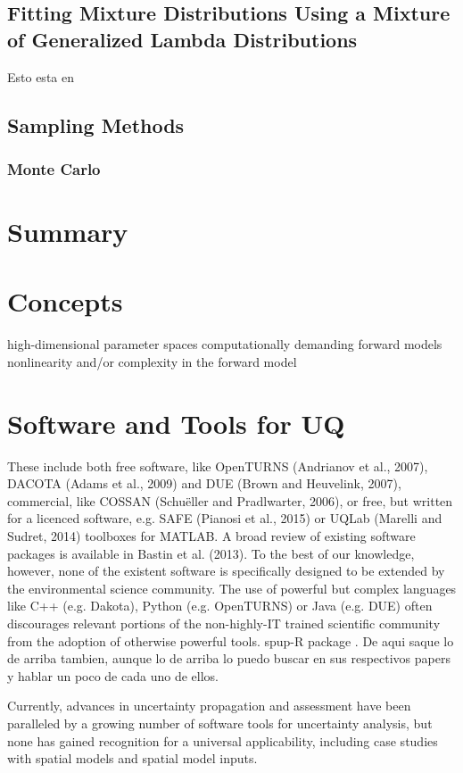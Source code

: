 \subsection{Fitting Mixture Distributions Using a Mixture of Generalized Lambda Distributions}
Esto esta en \cite{Tobergte2013}

\subsection{Sampling Methods}

\subsubsection{Monte Carlo}

\section{Summary}

\section{Concepts}
high-dimensional parameter spaces %
computationally demanding forward models 
nonlinearity and/or complexity in the forward model

\section{Software and Tools for UQ}
These include both free software, like OpenTURNS (Andrianov et al., 2007), DACOTA (Adams et al., 2009) and DUE (Brown and Heuvelink, 2007), commercial, like COSSAN (Schuëller and Pradlwarter, 2006), or free, but written for a licenced software, e.g. SAFE (Pianosi et al., 2015) or UQLab (Marelli and Sudret, 2014) toolboxes for MATLAB. A broad review of existing software packages is available in Bastin et al. (2013). To the best of our knowledge, however, none of the existent software is specifically designed to be extended by the environmental science community. The use of powerful but complex languages like C++ (e.g. Dakota), Python (e.g. OpenTURNS) or Java (e.g. DUE) often discourages relevant portions of the non-highly-IT trained scientific community from the adoption of otherwise powerful tools.
spup-R package \cite{Sawicka2016}. De aqui saque lo de arriba tambien, aunque lo de arriba lo puedo buscar en sus respectivos papers y hablar un poco de cada uno de ellos.

Currently, advances in uncertainty propagation and assessment have been paralleled by a growing number of software tools for uncertainty analysis, but none has gained recognition for a universal applicability, including case studies with spatial models and spatial model inputs. \cite{Sawicka2016}


%
